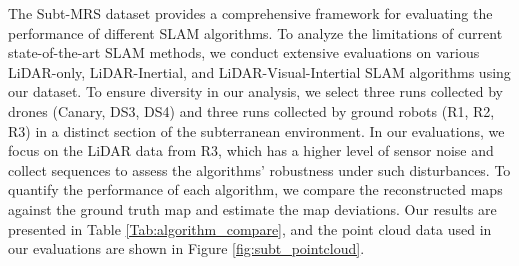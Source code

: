 \documentclass[10pt,twocolumn,letterpaper]{article}
\begin{document}
The Subt-MRS dataset provides a comprehensive framework for evaluating the performance of different SLAM algorithms. To analyze the limitations of current state-of-the-art SLAM methods, we conduct extensive evaluations on various LiDAR-only, LiDAR-Inertial, and LiDAR-Visual-Intertial SLAM algorithms using our dataset. To ensure diversity in our analysis, we select three runs collected by drones (Canary, DS3, DS4) and three runs collected by ground robots (R1, R2, R3) in a distinct section of the subterranean environment. In our evaluations, we focus on the LiDAR data from R3, which has a higher level of sensor noise and collect sequences to assess the algorithms' robustness under such disturbances. To quantify the performance of each algorithm, we compare the reconstructed maps against the ground truth map and estimate the map deviations. Our results are presented in Table \ref{Tab:algorithm_compare}, and the point cloud data used in our evaluations are shown in Figure \ref{fig:subt_pointcloud}.
\end{document}
